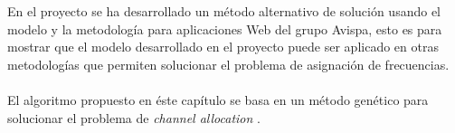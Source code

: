 En el proyecto se ha desarrollado un método alternativo de solución usando el modelo y la metodología para aplicaciones Web del grupo Avispa, esto es para mostrar que el modelo desarrollado en el proyecto puede ser aplicado en otras metodologías que permiten solucionar el problema de asignación de frecuencias.
\\\\
El algoritmo propuesto en éste capítulo se basa en un método genético para solucionar el problema de \textit{channel allocation} \cite{4554416}.
